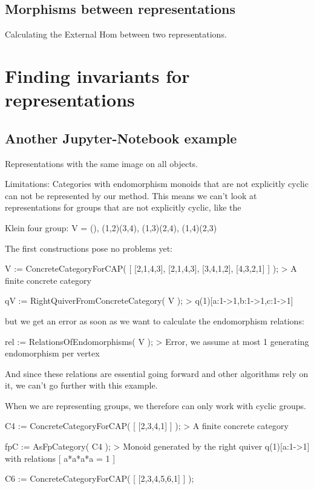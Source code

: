 \documentclass[12pt,compress]{beamer}
\begin{document}
\subsection{Morphisms between representations}

\begin{frame}
Calculating the External Hom between two representations.
\end{frame}

\section{Finding invariants for representations}

\subsection{Another Jupyter-Notebook example}

\begin{frame}
Representations with the same image on all objects.
\end{frame}








Limitations: Categories with endomorphism monoids that are not explicitly cyclic
can not be represented by our method. This means we can't look at representations
for groups that are not explicitly cyclic, like the

Klein four group: V = {(), (1,2)(3,4), (1,3)(2,4), (1,4)(2,3) }

The first constructions pose no problems yet:

V := ConcreteCategoryForCAP( [ [2,1,4,3], [2,1,4,3], [3,4,1,2], [4,3,2,1] ] );
> A finite concrete category

qV := RightQuiverFromConcreteCategory( V );
> q(1)[a:1->1,b:1->1,c:1->1]

but we get an error as soon as we want to calculate the endomorphism relations:

rel := RelationsOfEndomorphisms( V );
> Error, we assume at most 1 generating endomorphism per vertex

And since these relations are essential going forward and other algorithms rely on it,
we can't go further with this example.

When we are representing groups, we therefore can only work with cyclic groups.

C4 := ConcreteCategoryForCAP( [ [2,3,4,1] ] );
> A finite concrete category

fpC := AsFpCategory( C4 );
> Monoid generated by the right quiver q(1)[a:1->1] with relations [ a*a*a*a = 1 ]


C6 := ConcreteCategoryForCAP( [ [2,3,4,5,6,1] ] );
\end{document}
